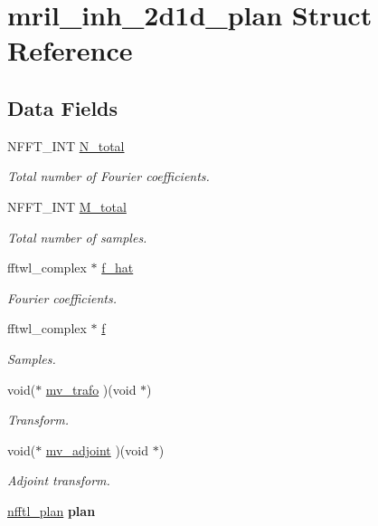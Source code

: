 \hypertarget{structmril__inh__2d1d__plan}{\section{mril\-\_\-inh\-\_\-2d1d\-\_\-plan Struct Reference}
\label{structmril__inh__2d1d__plan}
}
\subsection*{Data Fields}
\begin{DoxyCompactItemize}
\item 
N\-F\-F\-T\-\_\-\-I\-N\-T \hyperlink{structmril__inh__2d1d__plan_a3a23d1594bc977848d228d087f774602}{N\-\_\-total}
\begin{DoxyCompactList}\small\item\em Total number of Fourier coefficients. \end{DoxyCompactList}\item 
N\-F\-F\-T\-\_\-\-I\-N\-T \hyperlink{structmril__inh__2d1d__plan_a83a74050d6d0d32eda74ad81b9da4536}{M\-\_\-total}
\begin{DoxyCompactList}\small\item\em Total number of samples. \end{DoxyCompactList}\item 
fftwl\-\_\-complex $\ast$ \hyperlink{structmril__inh__2d1d__plan_a70247e89a002d0e7b5c66d1e87b33645}{f\-\_\-hat}
\begin{DoxyCompactList}\small\item\em Fourier coefficients. \end{DoxyCompactList}\item 
fftwl\-\_\-complex $\ast$ \hyperlink{structmril__inh__2d1d__plan_a3e2fef5b1bb862347511209994235597}{f}
\begin{DoxyCompactList}\small\item\em Samples. \end{DoxyCompactList}\item 
void($\ast$ \hyperlink{structmril__inh__2d1d__plan_a7dbc7cd7b733b5850a59f35aa0f959d1}{mv\-\_\-trafo} )(void $\ast$)
\begin{DoxyCompactList}\small\item\em Transform. \end{DoxyCompactList}\item 
void($\ast$ \hyperlink{structmril__inh__2d1d__plan_a6259dd5746b911632df1286d0654eabe}{mv\-\_\-adjoint} )(void $\ast$)
\begin{DoxyCompactList}\small\item\em Adjoint transform. \end{DoxyCompactList}\item 
\hypertarget{structmril__inh__2d1d__plan_abbc8cab682b3da749c06f40e70bc475b}{\hyperlink{structnfftl__plan}{nfftl\-\_\-plan} {\bfseries plan}}\label{structmril__inh__2d1d__plan_abbc8cab682b3da749c06f40e70bc475b}


\end{DoxyCompactItemize}
